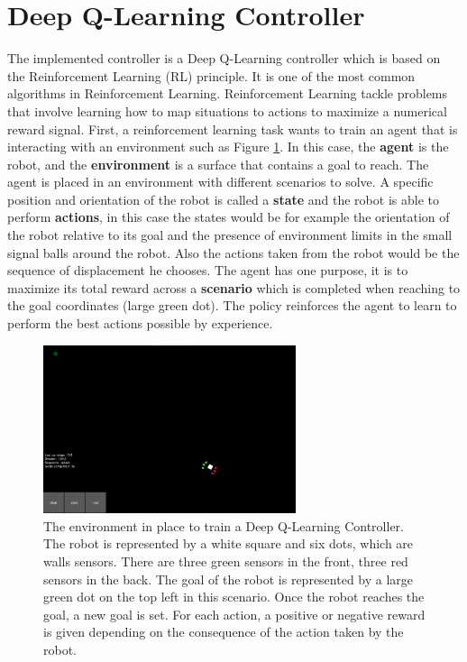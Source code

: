     \section{Deep Q-Learning Controller}
        The implemented controller is a Deep Q-Learning controller which is based on the Reinforcement Learning (RL) principle. It is one of the most common algorithms in Reinforcement Learning. Reinforcement Learning tackle problems that involve learning how to map situations to actions to maximize a numerical reward signal\cite{sutton_barto}. First, a reinforcement learning task wants to train an agent that is interacting with an environment such as Figure \ref{fig:arena}. In this case, the \textbf{agent} is the robot, and the \textbf{environment} is a surface that contains a goal to reach. The agent is placed in an environment with different scenarios to solve. A specific position and orientation of the robot is called a \textbf{state} and the robot is able to perform \textbf{actions}, in this case the states would be for example the orientation of the robot relative to its goal and the presence of environment limits in the small signal balls around the robot. Also the actions taken from the robot would be the sequence of displacement he chooses. The agent has one purpose, it is to maximize its total reward across a \textbf{scenario} which is completed when reaching to the goal coordinates (large green dot). The policy reinforces the agent to learn to perform the best actions possible by experience. 
        
        \begin{figure}[h!]
            \centering
            \includegraphics[width=0.66\textwidth]{images/arena.png}
            \caption{The environment in place to train a Deep Q-Learning Controller. The robot is represented by a white square and six dots, which are walls sensors. There are three green sensors in the front, three red sensors in the back. The goal of the robot is represented by a large green dot on the top left in this scenario. Once the robot reaches the goal, a new goal is set. For each action, a positive or negative reward is given depending on the consequence of the action taken by the robot.}
            \label{fig:arena}
        \end{figure}
        
